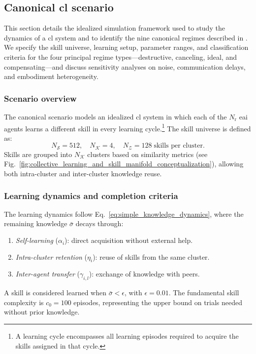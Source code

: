 \subsection{Canonical \ac{cl} scenario}
\label{sec:canonical_cl_scenario}

This section details the idealized simulation framework used to study the dynamics of a \ac{cl} system and to identify the nine canonical regimes described in . We specify the skill universe, learning setup, parameter ranges, and classification criteria for the four principal regime types---destructive, canceling, ideal, and compensating---and discuss sensitivity analyses on noise, communication delays, and embodiment heterogeneity.

\subsubsection{Scenario overview}
The canonical scenario models an idealized \ac{cl} system in which each of the $N_\mathrm{r}$ \ac{eai} agents learns a different skill in every learning cycle.\footnote{A learning cycle encompasses all learning episodes required to acquire the skills assigned in that cycle.} The skill universe is defined as:
\begin{equation*}
    N_\mathcal{S} = 512, \quad N_\mathcal{K} = 4, \quad N_\mathcal{Z} = 128 \; \text{skills per cluster}.
\end{equation*}
Skills are grouped into $N_\mathcal{K}$ clusters based on similarity metrics (see Fig.~\ref{fig:collective_learning_and_skill_manifold_conceptualization}), allowing both intra-cluster and inter-cluster knowledge reuse.

\subsubsection{Learning dynamics and completion criteria}
The learning dynamics follow Eq.~\eqref{eq:simple_knowledge_dynamics}, where the remaining knowledge $\bar{\sigma}$ decays through:
\begin{enumerate}
    \item \emph{Self-learning} ($\alpha_i$): direct acquisition without external help.
    \item \emph{Intra-cluster retention} ($\eta_i$): reuse of skills from the same cluster.
    \item \emph{Inter-agent transfer} ($\gamma_{i,l}$): exchange of knowledge with peers.
\end{enumerate}
A skill is considered learned when $\bar{\sigma} < \epsilon$, with $\epsilon = 0.01$. The fundamental skill complexity is $c_0 = 100$ episodes, representing the upper bound on trials needed without prior knowledge.


